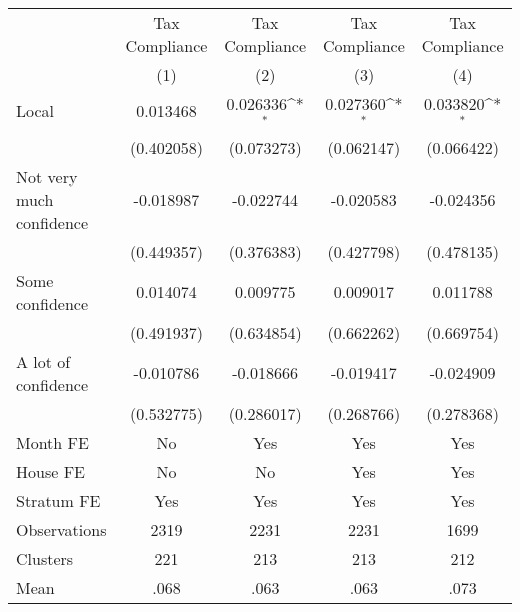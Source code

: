 {
\def\sym#1{\ifmmode^{#1}\else\(^{#1}\)\fi}
\begin{tabular}{l*{4}{c}}
\toprule
                &\multicolumn{1}{c}{Tax Compliance}&\multicolumn{1}{c}{Tax Compliance}&\multicolumn{1}{c}{Tax Compliance}&\multicolumn{1}{c}{Tax Compliance}\\
                &\multicolumn{1}{c}{(1)}         &\multicolumn{1}{c}{(2)}         &\multicolumn{1}{c}{(3)}         &\multicolumn{1}{c}{(4)}         \\
\midrule
Local           & 0.013468         & 0.026336\sym{*}  & 0.027360\sym{*}  & 0.033820\sym{*}  \\
                &(0.402058)         &(0.073273)         &(0.062147)         &(0.066422)         \\
Not very much confidence&-0.018987         &-0.022744         &-0.020583         &-0.024356         \\
                &(0.449357)         &(0.376383)         &(0.427798)         &(0.478135)         \\
Some confidence & 0.014074         & 0.009775         & 0.009017         & 0.011788         \\
                &(0.491937)         &(0.634854)         &(0.662262)         &(0.669754)         \\
A lot of confidence&-0.010786         &-0.018666         &-0.019417         &-0.024909         \\
                &(0.532775)         &(0.286017)         &(0.268766)         &(0.278368)         \\
Month FE        &       No         &      Yes         &      Yes         &      Yes         \\
House FE        &       No         &       No         &      Yes         &      Yes         \\
Stratum FE      &      Yes         &      Yes         &      Yes         &      Yes         \\
\midrule
Observations    &     2319         &     2231         &     2231         &     1699         \\
Clusters        &      221         &      213         &      213         &      212         \\
Mean            &     .068         &     .063         &     .063         &     .073         \\
\bottomrule
\end{tabular}
}
